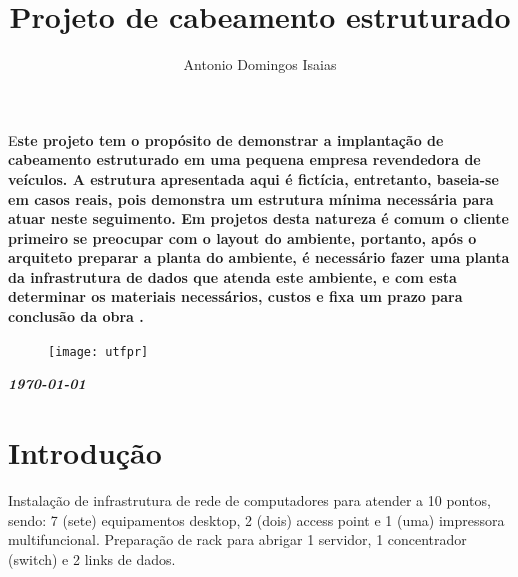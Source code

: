 \documentclass[	DIV=calc,%
							paper=a4,%
							fontsize=12pt,%
							onecolumn]{scrartcl}	 					%
\title{Projeto de cabeamento estruturado}					%
\author{Antonio Domingos Isaias }  	%
\date{}																				%
\newcommand{\initial}[1]{%
     \lettrine[lines=3,lhang=0.3,nindent=0em]{
     				\color{DarkGoldenrod}
     				{\textsf{#1}}}{}}
\begin{document}
\maketitle
\thispagestyle{fancy} 	
\thispagestyle{empty}		%




\initial{E}\textbf{ste projeto tem o propósito de demonstrar a implantação de cabeamento estruturado em uma pequena empresa revendedora de veículos. A estrutura apresentada aqui é fictícia, entretanto, baseia-se em casos reais, pois demonstra um estrutura mínima necessária para atuar neste seguimento.
	Em projetos desta natureza é comum o cliente primeiro se preocupar com o layout do ambiente, portanto, após o arquiteto preparar a planta do ambiente, é necessário fazer uma planta da infrastrutura de dados que atenda este ambiente, e com esta determinar os materiais necessários, custos e fixa um prazo para conclusão da obra  
	.}

\begin{figure}
	\centering
	\texttt{[image: utfpr]}
\end{figure}

\vspace{3cm}
\centerline{\textit{\textbf{\today}}}

\clearpage
    \renewcommand*\listfigurename{Lista de figuras}
\listoffigures

\renewcommand*\listtablename{Lista de tabelas}
\listoftables




\clearpage
\renewcommand{\contentsname}{Sumário}
\tableofcontents
\clearpage

\section{Introdução}
Instalação de infrastrutura de rede de computadores para atender a 10 pontos, sendo: 7 (sete) equipamentos desktop, 2 (dois) access point e 1 (uma) impressora multifuncional.
Preparação de rack para abrigar 1 servidor, 1 concentrador (switch) e 2 links de dados.
\end{document}
